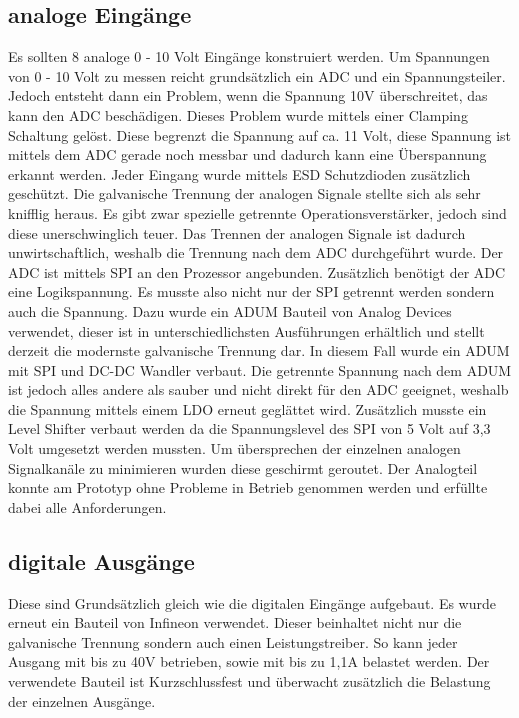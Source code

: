 \documentclass[praktikum,german]{hgbthesis}
\begin{document}
\subsection{analoge Eingänge}
Es sollten 8 analoge 0 - 10 Volt Eingänge konstruiert werden. Um Spannungen von 0 - 10 Volt zu messen reicht grundsätzlich ein ADC und ein Spannungsteiler. Jedoch entsteht dann ein Problem, wenn die Spannung 10V überschreitet, das kann den ADC beschädigen. Dieses Problem wurde mittels einer Clamping Schaltung gelöst. Diese begrenzt die Spannung auf ca. 11 Volt, diese Spannung ist mittels dem ADC gerade noch messbar und dadurch kann eine Überspannung erkannt werden. Jeder Eingang wurde mittels ESD Schutzdioden zusätzlich geschützt. Die galvanische Trennung der analogen Signale stellte sich als sehr knifflig heraus. Es gibt zwar spezielle getrennte Operationsverstärker, jedoch sind diese unerschwinglich teuer. Das Trennen der analogen Signale ist dadurch unwirtschaftlich, weshalb die Trennung nach dem ADC durchgeführt wurde. Der ADC ist mittels SPI an den Prozessor angebunden. Zusätzlich benötigt der ADC eine Logikspannung. Es musste also nicht nur der SPI getrennt werden sondern auch die Spannung. Dazu wurde ein ADUM Bauteil von Analog Devices verwendet, dieser ist in unterschiedlichsten Ausführungen erhältlich und stellt derzeit die modernste galvanische Trennung dar. In diesem Fall wurde ein ADUM mit SPI und DC-DC Wandler verbaut. Die getrennte Spannung nach dem ADUM ist jedoch alles andere als sauber und nicht direkt für den ADC geeignet, weshalb die Spannung mittels einem LDO erneut geglättet wird. Zusätzlich musste ein Level Shifter verbaut werden da die Spannungslevel des SPI von 5 Volt auf 3,3 Volt umgesetzt werden mussten. Um übersprechen der einzelnen analogen Signalkanäle zu minimieren wurden diese geschirmt geroutet. Der Analogteil konnte am Prototyp ohne Probleme in Betrieb genommen werden und erfüllte dabei alle Anforderungen.

\subsection{digitale Ausgänge}
Diese sind Grundsätzlich gleich wie die digitalen Eingänge aufgebaut. Es wurde erneut ein Bauteil von Infineon verwendet. Dieser beinhaltet nicht nur die galvanische Trennung sondern auch einen Leistungstreiber. So kann jeder Ausgang mit bis zu 40V betrieben, sowie mit bis zu 1,1A belastet werden. Der verwendete Bauteil ist Kurzschlussfest und überwacht zusätzlich die Belastung der einzelnen Ausgänge.
\end{document}
